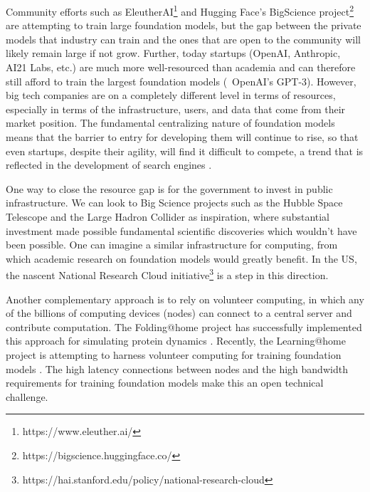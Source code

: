 Community efforts such as EleutherAI\footnote{https://www.eleuther.ai/} and Hugging Face's BigScience project\footnote{https://bigscience.huggingface.co/}
are attempting to train large foundation models,
but the gap between the private models that industry can train
and the ones that are open to the community will likely remain large if not grow.
Further, today startups (OpenAI, Anthropic, AI21 Labs, etc.) are much more well-resourced than academia
and can therefore still afford to train the largest foundation models (\eg~OpenAI's GPT-3).
However, big tech companies are on a completely different level
in terms of resources, especially in terms of the infrastructure, users, and data that come from their market position.
The fundamental centralizing nature of foundation models
means that the barrier to entry for developing them will continue to rise,
so that even startups, despite their agility, will find it difficult to compete,
a trend that is reflected in the development of search engines \citep{radinsky2015data}.

One way to close the resource gap is for the government to invest in public infrastructure.
We can look to Big Science projects such as the Hubble Space Telescope and the Large Hadron Collider as inspiration,
where substantial investment made possible fundamental scientific discoveries which wouldn't have been possible.
One can imagine a similar infrastructure for computing, from which academic research on foundation models would greatly benefit.
In the US, the nascent National Research Cloud initiative\footnote{https://hai.stanford.edu/policy/national-research-cloud} is a step in this direction.

Another complementary approach is to rely on volunteer computing,
in which any of the billions of computing devices (nodes) can connect to a central server and contribute computation.
The Folding@home project has successfully implemented this approach for simulating protein dynamics \citep{beberg2009folding}.
Recently, the Learning@home project is attempting to harness volunteer computing for training foundation models
\citep{Ryabinin2020Learninghome}.
The high latency connections between nodes and the high bandwidth requirements for training foundation models
make this an open technical challenge.

